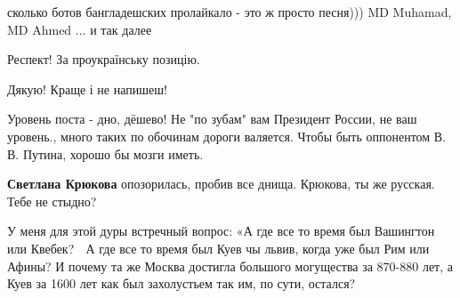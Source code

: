 \begin{itemize}
сколько ботов бангладешских пролайкало - это ж просто песня))) MD Muhamad, MD Ahmed ... и так далее🤣

 
Респект! За проукраїнську позицію.

 
Дякую! Краще і не напишеш!

 
Уровень поста - дно, дёшево! Не "по зубам" вам Президент России, не ваш уровень., много таких по обочинам дороги валяется. Чтобы быть оппонентом В. В. Путина, хорошо бы мозги иметь.

 
\textbf{Светлана Крюкова} опозорилась, пробив все днища.
Крюкова, ты же русская. Тебе не стыдно?

 

У меня для этой дуры встречный вопрос: «А где все то время был Вашингтон или
Квебек? 🤔 А где все то время был Куев чы львив, когда уже был Рим или Афины? И
почему та же Москва достигла большого могущества за 870-880 лет, а Куев за 1600
лет как был захолустьем так им, по сути, остался? 🤔😆

 


\end{itemize}
